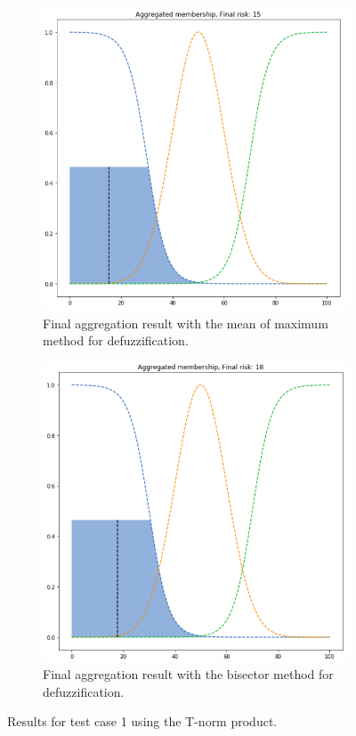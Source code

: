 \begin{figure}[ht]
\begin{subfigure}{.5\textwidth}
  \centering
  \includegraphics[width=.8\linewidth]{figures/first/prod-mom.png}  
  \caption{Final aggregation result with the mean of maximum method for defuzzification.}
  \label{fig:1prod-mom}
\end{subfigure}
\begin{subfigure}{.5\textwidth}
  \centering
  \includegraphics[width=.8\linewidth]{figures/first/prod-bisector.png}  
  \caption{Final aggregation result with the bisector method for defuzzification.}
  \label{fig:1prod-bisector}
\end{subfigure}
\caption{Results for test case 1 using the T-norm product.}
\label{fig:testcase1prod}
\end{figure}